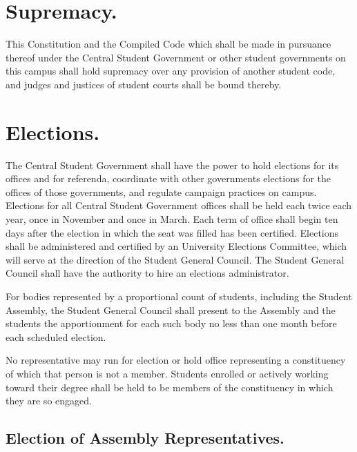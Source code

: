 \section{Supremacy.}
    This Constitution and the Compiled Code which shall be made in pursuance thereof under the Central Student Government or other student governments on this campus shall hold supremacy over any provision of another student code, and judges and justices of student courts shall be bound thereby.

\section{Elections.}
    The Central Student Government shall have the power to hold elections for its offices and for referenda, coordinate with other governments elections for the offices of those governments, and regulate campaign practices on campus. Elections for all Central Student Government offices shall be held each twice each year, once in November and once in March. Each term of office shall begin ten days after the election in which the seat was filled has been certified. Elections shall be administered and certified by an University Elections Committee, which will serve at the direction of the Student General Council. The Student General Council shall have the authority to hire an elections administrator.

    For bodies represented by a proportional count of students, including the Student Assembly, the Student General Council shall present to the Assembly and the students the apportionment for each such body no less than one month before each scheduled election.

    No representative may run for election or hold office representing a constituency of which that person is not a member. Students enrolled or actively working toward their degree shall be held to be members of the constituency in which they are so engaged.


\subsection{Election of Assembly Representatives.}

